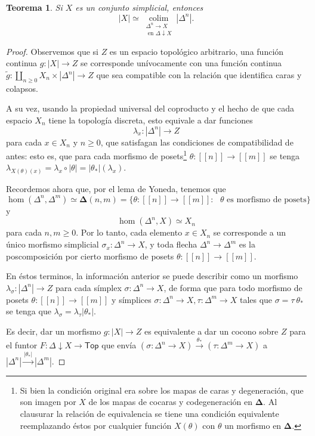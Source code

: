 \documentclass[11pt]{report}
\theoremstyle{colored}
\newtheorem{theorem}{Teorema}[section]
\newcommand{\nat}[1]{[\![#1]\!]}
\newcommand{\ord}[1]{\nat{#1}}
\renewcommand{\ss}[1]{\Delta^{#1}}
\newcommand{\ordcat}{\boldsymbol{\Delta}}
\newcommand{\catcolim}[2]{\underset{#1}{\operatorname{colim}}#2}
\begin{document}
\begin{theorem} Si $X$ es un conjunto simplicial, entonces
\[
|X| \simeq \catcolim{\substack{\ss{n} \to X \\ \text{ en $\Delta \downarrow X$}}}{|\ss{n}|}.
\]
\end{theorem}
\begin{proof} Observemos que si $Z$ es un espacio topológico arbitrario, una función continua $g : |X| \to Z$ se corresponde unívocamente con una función continua $\tilde{g} : \coprod_{n \geq 0} X_n \times |\ss{n}| \to Z$ que sea compatible con la relación que identifica caras y colapsos.

A su vez, usando la propiedad universal del coproducto y el hecho de que cada espacio $X_n$ tiene la topología discreta, esto equivale a dar funciones
\[
\lambda_x : |\ss{n}| \to Z
\]
para cada $x \in X_n$ y $n \geq 0$, que satisfagan las condiciones de compatibilidad de antes: esto es, que para cada morfismo de posets\footnote{Si bien la condición original era sobre los mapas de caras y degeneración, que son imagen por $X$ de los mapas de cocaras y codegeneración en $\ordcat$. Al clausurar la relación de equivalencia se tiene una condición equivalente reemplazando éstos por cualquier función $X(\theta)$ con $\theta$ un morfismo en $\ordcat$.} $\theta : \ord{n} \to \ord{m}$ se tenga $\lambda_{X(\theta)(x)} = \lambda_x \circ |\theta| = |\theta_*|(\lambda_x)$.

Recordemos ahora que, por el lema de Yoneda, tenemos que
\[
\hom(\ss{n},\ss{m}) \simeq \ordcat(n,m) = \{\theta : \ord{n} \to \ord{m} : \text{ $\theta$ es morfismo de posets}\}
\]
y
\[
\hom(\ss{n}, X) \simeq X_n
\]
para cada $n,m \geq 0$. Por lo tanto, cada elemento $x \in X_n$ se corresponde a un único morfismo simplicial $\sigma_x : \ss{n} \to X$, y toda flecha $\ss{n} \to \ss{m}$ es la poscomposición por cierto morfismo de posets $\theta: \ord{n} \to \ord{m}$.

En éstos terminos, la información anterior se puede describir como un morfismo $\lambda_\sigma : |\ss{n}| \to Z$ para cada símplex $\sigma : \ss{n} \to X$, de forma que para todo morfismo de posets $\theta : \ord{n} \to \ord{m}$ y símplices $\sigma : \ss{n} \to X, \tau : \ss{m} \to X$ tales que $\sigma = \tau \  \theta_*$ se tenga que $\lambda_\sigma = \lambda_\tau |\theta_*|$. 

Es decir, dar un morfismo $g : |X| \to Z$ es equivalente a dar un cocono sobre $Z$ para el funtor $F : \Delta \downarrow X \to \mathsf{Top}$ que envía $(\sigma : \ss{n} \to X) \xrightarrow{\theta_*} (\tau : \ss{m} \to X)$ a $|\ss{n}| \xrightarrow{|\theta_*|} |\ss{m}|$.


\end{proof}
\end{document}
